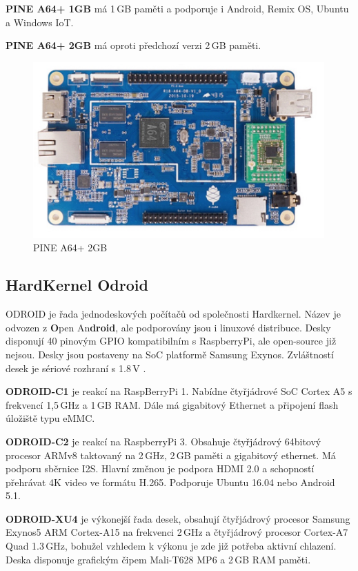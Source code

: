 \textbf{PINE A64+ 1GB} má 1\,GB paměti a podporuje i Android, Remix OS, Ubuntu a Windows IoT.

\textbf{PINE A64+ 2GB} má oproti předchozí verzi 2\,GB paměti.

\begin{figure}[!h]
  \begin{center}
    \includegraphics[scale=0.8]{obrazky/embed_pine}
  \end{center}
  \caption{PINE A64+ 2GB \cite{Pine64}}
\end{figure}

\newpage

\subsection{HardKernel Odroid}
	\label{KapKernel}
ODROID je řada jednodeskových počítačů od společnosti Hardkernel. Název je odvozen z \textbf{O}pen An\textbf{droid}, ale podporovány jsou i linuxové distribuce. Desky disponují 40 pinovým GPIO kompatibilním s RaspberryPi, ale open-source již nejsou. Desky jsou postaveny na SoC platformě Samsung Exynos. Zvláštností desek je sériové rozhraní s 1.8\,V \cite{HardKernel}.
	
	\textbf{ODROID-C1} je reakcí na RaspBerryPi 1. Nabídne čtyřjádrové SoC Cortex A5 s frekvencí 1,5\,GHz a 1\,GB RAM. Dále má gigabitový Ethernet a připojení flash úložiště typu eMMC. 

	\textbf{ODROID-C2} je reakcí na RaspberryPi 3. Obsahuje čtyřjádrový 64bitový procesor ARMv8 taktovaný na 2\,GHz, 2\,GB paměti a gigabitový ethernet. Má podporu sběrnice I2S. Hlavní změnou je podpora HDMI 2.0 a schopností přehrávat 4K video ve formátu H.265. Podporuje Ubuntu 16.04 nebo Android 5.1. 
	
	\textbf{ODROID-XU4} je výkonejší řada desek, obsahují čtyřjádrový procesor Samsung Exynos5 ARM Cortex-A15 na frekvenci 2\,GHz a čtyřjádrový procesor Cortex-A7 Quad 1.3\,GHz, bohužel vzhledem k výkonu je zde již potřeba aktivní chlazení. Deska disponuje grafickým čipem Mali-T628 MP6 a 2\,GB RAM paměti.

